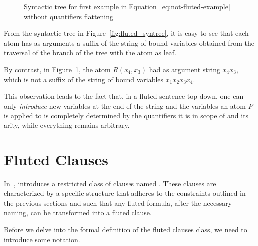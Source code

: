 \begin{figure}[H]
    \centering
    \caption{Syntactic tree for first example in Equation~\ref{eq:not-fluted-example} without quantifiers flattening}\label{fig:not_fluted_syntree}
\end{figure}

From the syntactic tree in Figure~\ref{fig:fluted_syntree}, it is easy to see that each atom has as arguments a suffix of the string of bound variables obtained from the traversal of the branch of the tree with the atom as leaf.

By contrast, in Figure~\ref{fig:not_fluted_syntree}, the atom \(R(x_4, x_3)\) had as argument string \(x_4 x_3\), which is not a suffix of the string of bound variables \(x_1 x_2 x_3 x_4\).

This observation leads to the fact that, in  a fluted sentence top-down, one can only \emph{introduce} new variables at the end of the string and the variables an atom \(P\) is applied to is completely determined by the quantifiers it is in scope of and its arity, while everything remains arbitrary.

\section{Fluted Clauses}\label{sec:fluted-clauses}

In~\cite{schmidt2000resolution}, \citeauthor{schmidt2000resolution} introduces a restricted class of clauses named .
These clauses are characterized by a specific structure that adheres to the constraints outlined in the previous sections and such that any fluted formula, after the necessary naming, can be transformed into a fluted clause.

Before we delve into the formal definition of the fluted clauses class, we need to introduce some notation.


